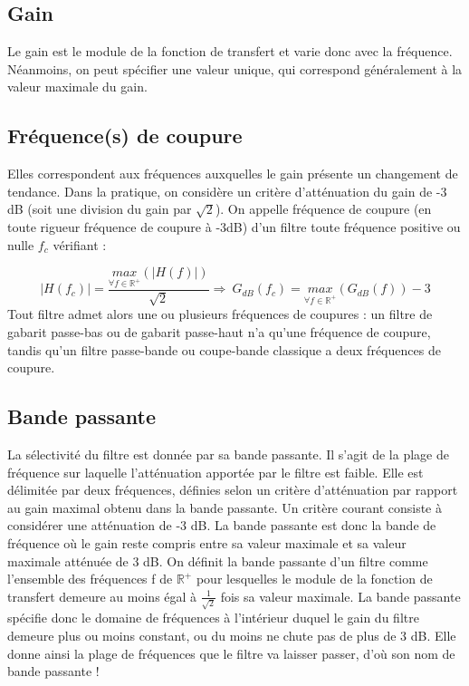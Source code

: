 	\subsection{Gain}
	
	Le gain est le module de la fonction de transfert et varie donc avec la fréquence. Néanmoins, on peut spécifier une valeur unique, qui correspond généralement à la valeur maximale du gain.
	
	\subsection{Fréquence(s) de coupure}
	
	Elles correspondent aux fréquences auxquelles le gain présente un changement de tendance. Dans la pratique, on considère un critère d'atténuation du gain de -3 dB (soit une division du gain par $\sqrt{2}$). On appelle fréquence de coupure (en toute rigueur fréquence de coupure à -3dB) d’un filtre toute fréquence positive ou nulle $f_{c}$ vérifiant :
	
	\begin{equation}\label{key}
	|H(f_{c})|=\frac{\underset{\forall f \in \mathbb{R}^{+}}{max}(|H(f)|)}{\sqrt{2}} \Rightarrow~G_{dB}(f_{c})=\underset{\forall f \in \mathbb{R}^{+}}{max}(G_{dB}(f))-3
	\end{equation}
	Tout filtre admet alors une ou plusieurs fréquences de coupures : un filtre de gabarit passe-bas ou de gabarit passe-haut n’a qu’une fréquence de coupure, tandis qu’un filtre passe-bande ou coupe-bande classique a deux fréquences de coupure.
	
	\subsection{Bande passante}
	
	La sélectivité du filtre est donnée par sa bande passante. Il s'agit de la plage de fréquence sur laquelle l'atténuation apportée par le filtre est faible. Elle est délimitée par deux fréquences, définies selon un critère d'atténuation par rapport au gain maximal obtenu dans la bande passante. Un critère courant consiste à considérer une atténuation de -3 dB. La bande passante est donc la bande de fréquence où le gain reste compris entre sa valeur maximale et sa valeur maximale atténuée de 3 dB. On définit la bande passante d’un filtre comme l’ensemble des fréquences f de $\mathbb{R}^{+}$ pour lesquelles le module de la fonction de transfert demeure au moins égal à $\frac{1}{\sqrt{2}}$ fois sa valeur maximale. 
	La bande passante spécifie donc le domaine de fréquences à l’intérieur duquel le gain du filtre demeure plus ou moins constant, ou du moins ne chute pas de plus de 3 dB. Elle donne ainsi la plage de fréquences que le filtre va laisser passer, d’où son nom de bande passante ! 
	
